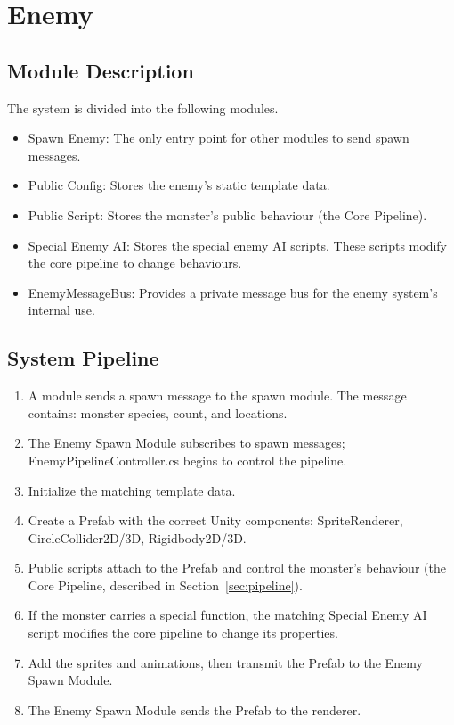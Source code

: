 \section{Enemy}

\subsection{Module Description}

\par \hspace{1.5em} The system is divided into the following modules.

\begin{itemize}
  \item Spawn Enemy: The only entry point for other modules to send spawn messages.
  \item Public Config: Stores the enemy's static template data.
  \item Public Script: Stores the monster's public behaviour (the Core Pipeline).
  \item Special Enemy AI: Stores the special enemy AI scripts. These scripts modify the core pipeline to change behaviours.
  \item EnemyMessageBus: Provides a private message bus for the enemy system's internal use.
\end{itemize}

\subsection{System Pipeline}

\begin{enumerate}[label=Step \arabic*:, leftmargin = 5em]
	\item A module sends a spawn message to the spawn module. The message contains: monster species, count, and locations.
	\item The Enemy Spawn Module subscribes to spawn messages; EnemyPipelineController.cs begins to control the pipeline.
	\item Initialize the matching template data.
	\item Create a Prefab with the correct Unity components: SpriteRenderer, CircleCollider2D/3D, Rigidbody2D/3D.
	\item Public scripts attach to the Prefab and control the monster's behaviour (the Core Pipeline, described in Section~\ref{sec:pipeline}).
	\item If the monster carries a special function, the matching Special Enemy AI script modifies the core pipeline to change its properties.
	\item Add the sprites and animations, then transmit the Prefab to the Enemy Spawn Module.
	\item The Enemy Spawn Module sends the Prefab to the renderer.
\end{enumerate}

